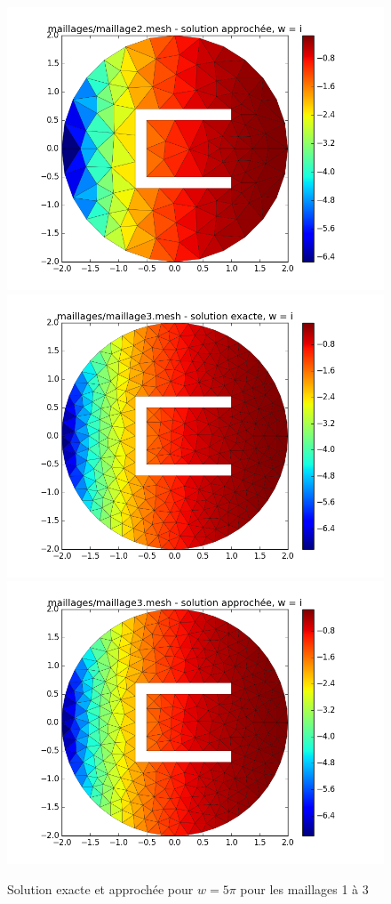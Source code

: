\documentclass[a4paper,12pt]{article}
\begin{document}
\begin{figure}[H]
\begin{center}
        \includegraphics[scale = 0.3]{image/1j/figure_2-2}
        \includegraphics[scale = 0.3]{image/1j/figure_3}
        \includegraphics[scale = 0.3]{image/1j/figure_3-3}
\end{center}
\caption{Solution exacte et approchée pour $w = 5\pi$ pour les maillages 1 à 3}
\end{figure}
\end{document}
